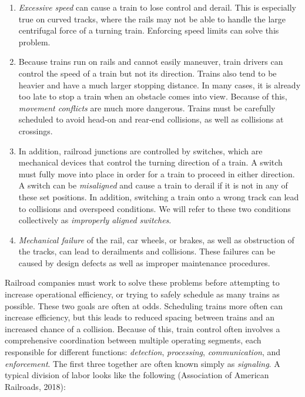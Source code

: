 \documentclass[11pt, titlepage]{article}
\begin{document}
\begin{enumerate}
    \item \textit{Excessive speed} can cause a train to lose control and derail.
    This is especially true on curved tracks, where the rails may not be able to
    handle the large centrifugal force of a turning train. Enforcing speed limits
    can solve this problem.
    \item Because trains run on rails and cannot easily maneuver, train drivers
    can control the speed of a train but not its direction. Trains also tend to be
    heavier and have a much larger stopping distance. In many cases, it is already
    too late to stop a train when an obstacle comes into view. Because of this,
    \textit{movement conflicts} are much more dangerous. Trains must be carefully
    scheduled to avoid head-on and rear-end collisions, as well as collisions at
    crossings.
    \item In addition, railroad junctions are controlled by switches, which are
    mechanical devices that control the turning direction of a train. A switch
    must fully move into place in order for a train to proceed in either
    direction. A switch can be \textit{misaligned} and cause a train to derail if
    it is not in any of these set positions. In addition, switching a train onto a
    wrong track can lead to collisions and overspeed conditions. We will refer to
    these two conditions collectively as \textit{improperly aligned switches}.
    \item \textit{Mechanical failure} of the rail, car wheels, or brakes, as well
    as obstruction of the tracks, can lead to derailments and collisions. These
    failures can be caused by design defects as well as improper maintenance
    procedures.
\end{enumerate}

Railroad companies must work to solve these problems before attempting to increase
operational efficiency, or trying to safely schedule as many trains as possible.
These two goals are often at odds. Scheduling trains more often can increase
efficiency, but this leads to reduced spacing between trains and an increased
chance of a collision. Because of this, train control often involves a
comprehensive coordination between multiple operating segments, each responsible
for different functions: \textit{detection}, \textit{processing},
\textit{communication}, and \textit{enforcement}. The first three together are
often known simply as \textit{signaling}. A typical division of labor looks like
the following (Association of American Railroads, 2018):
\end{document}
